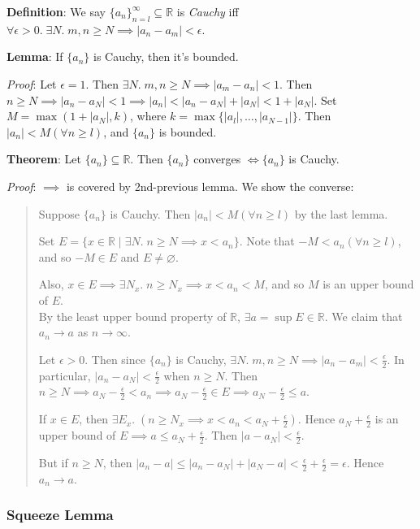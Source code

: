 \documentclass[11pt]{article}
\begin{document}
\textbf{Definition}: We say $\{a_n\}_{n=l}^\infty \subseteq \mathbb{R}$ is \emph{Cauchy} iff $\forall \epsilon > 0.\; \exists N.\; m,n \geq N \implies |a_n - a_m| < \epsilon$.

\textbf{Lemma}: If $\{a_n\}$ is Cauchy, then it's bounded.

\emph{Proof}: Let $\epsilon = 1$. Then $\exists N.\; m,n \geq N \implies |a_m - a_n| < 1$. Then $n \geq N \implies |a_n - a_N| < 1 \implies |a_n| < |a_n - a_N| + |a_N| < 1 + |a_N|$. Set $M = \max(1+ |a_N|, k)$, where $k = \max\{|a_l|, \ldots, |a_{N-1}|\}$. Then $|a_n| < M (\forall n \geq l)$, and $\{a_n\}$ is bounded.

\textbf{Theorem}: Let $\{a_n\} \subseteq \mathbb{R}$. Then $\{a_n\}$ converges $\iff \{a_n\}$ is Cauchy.

\emph{Proof}: $\implies$ is covered by 2nd-previous lemma. We show the converse:
\begin{quote}\vspace{-0.3cm}
Suppose $\{a_n\}$ is Cauchy. Then $|a_n| < M (\forall n \geq l)$ by the last lemma.

Set $E = \{x \in \mathbb{R} \;|\; \exists N.\; n \geq N \implies x < a_n\}$. Note that $-M < a_n (\forall n \geq l)$, and so $-M \in E$ and $E \neq \varnothing$.

Also, $x \in E \implies \exists N_x.\; n \geq N_x \implies x < a_n < M$, and so $M$ is an upper bound of $E$.\\
By the least upper bound property of $\mathbb{R}$, $\exists a = \sup E \in \mathbb{R}$. We claim that $a_n \to a$ as $n \to \infty$.

Let $\epsilon > 0$. Then since $\{a_n\}$ is Cauchy, $\exists N.\; m,n \geq N \implies |a_n - a_m| < \frac{\epsilon}{2}$. In particular, $|a_n - a_N| < \frac{\epsilon}{2}$ when $n \geq N$. Then $n \geq N \implies a_N - \frac{\epsilon}{2} < a_n \implies a_N - \frac{\epsilon}{2} \in E \implies a_N - \frac{\epsilon}{2} \leq a$.

If $x \in E$, then $\exists E_x.\; (n \geq N_x \implies x < a_n < a_N + \frac{\epsilon}{2})$. Hence $a_N + \frac{\epsilon}{2}$ is an upper bound of $E \implies a \leq a_N + \frac{\epsilon}{2}$. Then $|a - a_N| < \frac{\epsilon}{2}$.

But if $n \geq N$, then $|a_n - a| \leq |a_n - a_N| + |a_N - a| < \frac{\epsilon}{2} + \frac{\epsilon}{2} = \epsilon$. Hence $a_n \to a$.
\end{quote}

\subsubsection{Squeeze Lemma}
\end{document}
